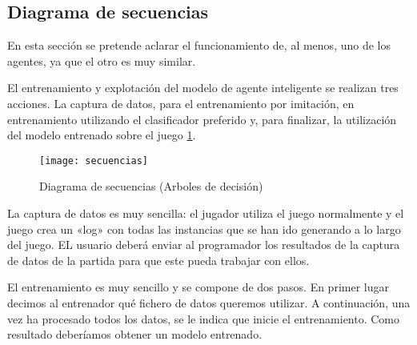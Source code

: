 \subsection {Diagrama de secuencias}
En esta sección se pretende aclarar el funcionamiento de, al menos, uno de los agentes, ya que el otro es muy similar.

El entrenamiento y explotación del modelo de agente inteligente se realizan tres acciones. La captura de datos, para el entrenamiento por imitación, en entrenamiento utilizando el clasificador preferido y, para finalizar, la utilización del modelo entrenado sobre el juego \ref{fig:d_sec}. 


\begin{figure}
    \centering
    \texttt{[image: secuencias]}
    \caption{Diagrama de secuencias (Arboles de decisión)}
    \label{fig:d_sec}
\end{figure}

La captura de datos es muy sencilla: el jugador utiliza el juego normalmente y el juego crea un «log» con todas las instancias que se han ido generando a lo largo del juego. EL usuario deberá enviar al programador los resultados de la captura de datos de la partida para que este pueda trabajar con ellos.

El entrenamiento es muy sencillo y se compone de dos pasos. En primer lugar decimos al entrenador qué fichero de datos queremos utilizar. A continuación, una vez ha procesado todos los datos, se le indica que inicie el entrenamiento. Como resultado deberíamos obtener un modelo entrenado.

